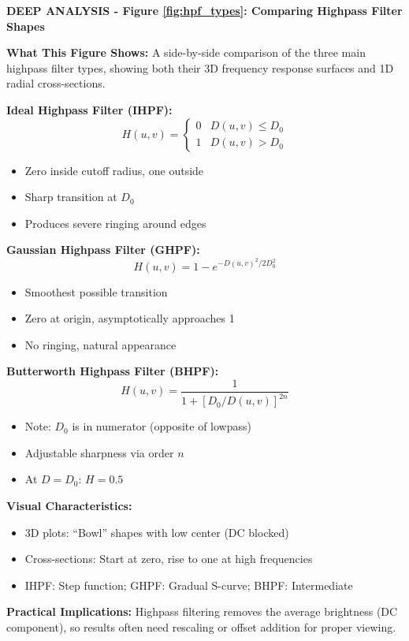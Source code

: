\documentclass[12pt,a4paper]{article}
\begin{document}
\begin{deepexplanation}
\textbf{DEEP ANALYSIS - Figure \ref{fig:hpf_types}: Comparing Highpass Filter Shapes}

\textbf{What This Figure Shows:}
A side-by-side comparison of the three main highpass filter types, showing both their 3D frequency response surfaces and 1D radial cross-sections.

\textbf{Ideal Highpass Filter (IHPF):}
\[
H(u, v) = \begin{cases} 0 & D(u, v) \leq D_0 \\ 1 & D(u, v) > D_0 \end{cases}
\]
\begin{itemize}
    \item Zero inside cutoff radius, one outside
    \item Sharp transition at $D_0$
    \item Produces severe ringing around edges
\end{itemize}

\textbf{Gaussian Highpass Filter (GHPF):}
\[
H(u, v) = 1 - e^{-D(u, v)^2 / 2D_0^2}
\]
\begin{itemize}
    \item Smoothest possible transition
    \item Zero at origin, asymptotically approaches 1
    \item No ringing, natural appearance
\end{itemize}

\textbf{Butterworth Highpass Filter (BHPF):}
\[
H(u, v) = \frac{1}{1 + [D_0/D(u, v)]^{2n}}
\]
\begin{itemize}
    \item Note: $D_0$ is in numerator (opposite of lowpass)
    \item Adjustable sharpness via order $n$
    \item At $D = D_0$: $H = 0.5$
\end{itemize}

\textbf{Visual Characteristics:}
\begin{itemize}
    \item 3D plots: ``Bowl'' shapes with low center (DC blocked)
    \item Cross-sections: Start at zero, rise to one at high frequencies
    \item IHPF: Step function; GHPF: Gradual S-curve; BHPF: Intermediate
\end{itemize}

\textbf{Practical Implications:}
Highpass filtering removes the average brightness (DC component), so results often need rescaling or offset addition for proper viewing.
\end{deepexplanation}
\end{document}
